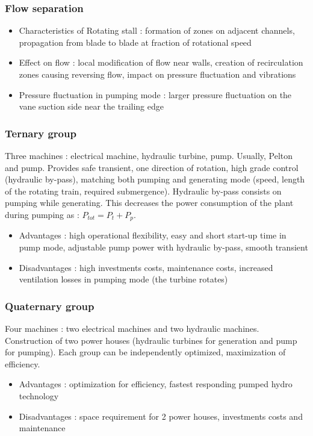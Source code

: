 \documentclass[../main.tex]{subfiles}
\begin{document}
\subsubsection{Flow separation}
\begin{itemize}
    \item Characteristics of Rotating stall : formation of zones on adjacent channels, propagation from blade to blade at fraction of rotational speed
    \item Effect on flow : local modification of flow near walls, creation of recirculation zones causing reversing flow, impact on pressure fluctuation and vibrations
    \item Pressure fluctuation in pumping mode : larger pressure fluctuation on the vane suction side near the trailing edge
\end{itemize}

\subsubsection{Ternary group}
Three machines : electrical machine, hydraulic turbine, pump. Usually, Pelton and pump. Provides safe transient, one direction of rotation, high grade control (hydraulic by-pass), matching both pumping and generating mode (speed, length of the rotating train, required submergence). Hydraulic by-pass consists on pumping while generating. This decreases the power consumption of the plant during pumping as : $P_{tot} = P_t + P_p$.\\
\begin{itemize}
    \item Advantages : high operational flexibility, easy and short start-up time in pump mode, adjustable pump power with hydraulic by-pass, smooth transient
    \item Disadvantages : high investments costs, maintenance costs, increased ventilation losses in pumping mode (the turbine rotates)
\end{itemize}

\subsubsection{Quaternary group}
Four machines : two electrical machines and two hydraulic machines. Construction of two power houses (hydraulic turbines for generation and pump for pumping). Each group can be independently optimized, maximization of efficiency. \\
\begin{itemize}
    \item Advantages : optimization for efficiency, fastest responding pumped hydro technology
    \item Disadvantages : space requirement for 2 power houses, investments costs and maintenance
\end{itemize}
\end{document}

